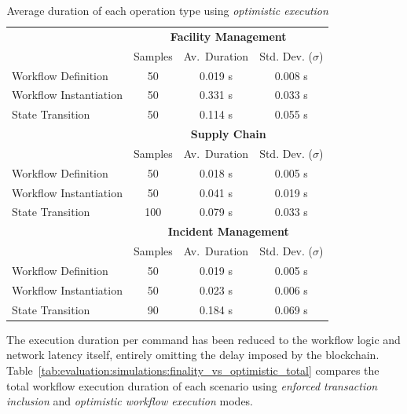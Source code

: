 \begin{table}[h]
\centering
\begin{tabular}{|l|c|c|c|}
    \hline
    & \multicolumn{3}{c|}{\bfseries Facility Management} \\ \cline{2-4}
    & Samples & Av.\ Duration & Std. Dev. ($\sigma$) \\
    \hline
    Workflow Definition    & 50  & 0.019 s & 0.008 s \\
    Workflow Instantiation & 50  & 0.331 s & 0.033 s \\
    State Transition       & 50  & 0.114 s & 0.055 s \\
    \hline
    & \multicolumn{3}{c|}{\bfseries Supply Chain} \\ \cline{2-4}
    & Samples & Av.\ Duration & Std. Dev. ($\sigma$) \\
    \hline
    Workflow Definition    & 50  & 0.018 s & 0.005 s \\
    Workflow Instantiation & 50  & 0.041 s & 0.019 s \\
    State Transition       & 100 & 0.079 s & 0.033 s \\
    \hline
    & \multicolumn{3}{c|}{\bfseries Incident Management} \\ \cline{2-4}
    & Samples & Av.\ Duration & Std. Dev. ($\sigma$) \\
    \hline
    Workflow Definition    & 50  & 0.019 s & 0.005 s \\
    Workflow Instantiation & 50  & 0.023 s & 0.006 s \\
    State Transition       & 90  & 0.184 s & 0.069 s \\
    \hline
\end{tabular}
\caption{Average duration of each operation type using \textit{optimistic execution}}
\label{tab:evaluation:simulations:optimistic_duration}
\end{table}

The execution duration per command has been reduced to the workflow logic and network latency itself, entirely omitting the delay imposed by the blockchain. Table~\ref{tab:evaluation:simulations:finality_vs_optimistic_total} compares the total workflow execution duration of each scenario using \textit{enforced transaction inclusion} and \textit{optimistic workflow execution} modes.

